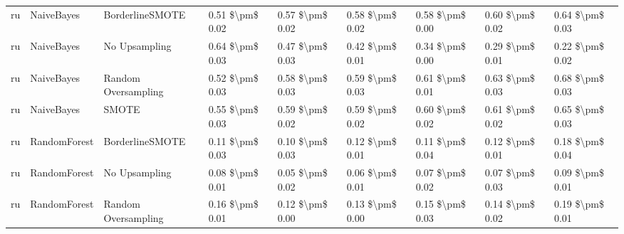 \begin{tabular}{lllllllll}
      ru &                      NaiveBayes &               BorderlineSMOTE &     0.51 \$\textbackslash pm\$ 0.02 &           0.57 \$\textbackslash pm\$ 0.02 &       0.58 \$\textbackslash pm\$ 0.02 &        0.58 \$\textbackslash pm\$ 0.00 &                         0.60 \$\textbackslash pm\$ 0.02 &     0.64 \$\textbackslash pm\$ 0.03 \\
      ru &                      NaiveBayes &                 No Upsampling &     0.64 \$\textbackslash pm\$ 0.03 &           0.47 \$\textbackslash pm\$ 0.03 &       0.42 \$\textbackslash pm\$ 0.01 &        0.34 \$\textbackslash pm\$ 0.00 &                         0.29 \$\textbackslash pm\$ 0.01 &     0.22 \$\textbackslash pm\$ 0.02 \\
      ru &                      NaiveBayes &           Random Oversampling &     0.52 \$\textbackslash pm\$ 0.03 &           0.58 \$\textbackslash pm\$ 0.03 &       0.59 \$\textbackslash pm\$ 0.03 &        0.61 \$\textbackslash pm\$ 0.01 &                         0.63 \$\textbackslash pm\$ 0.03 &     0.68 \$\textbackslash pm\$ 0.03 \\
      ru &                      NaiveBayes &                         SMOTE &     0.55 \$\textbackslash pm\$ 0.03 &           0.59 \$\textbackslash pm\$ 0.02 &       0.59 \$\textbackslash pm\$ 0.02 &        0.60 \$\textbackslash pm\$ 0.02 &                         0.61 \$\textbackslash pm\$ 0.02 &     0.65 \$\textbackslash pm\$ 0.03 \\
      ru &                    RandomForest &               BorderlineSMOTE &     0.11 \$\textbackslash pm\$ 0.03 &           0.10 \$\textbackslash pm\$ 0.03 &       0.12 \$\textbackslash pm\$ 0.01 &        0.11 \$\textbackslash pm\$ 0.04 &                         0.12 \$\textbackslash pm\$ 0.01 &     0.18 \$\textbackslash pm\$ 0.04 \\
      ru &                    RandomForest &                 No Upsampling &     0.08 \$\textbackslash pm\$ 0.01 &           0.05 \$\textbackslash pm\$ 0.02 &       0.06 \$\textbackslash pm\$ 0.01 &        0.07 \$\textbackslash pm\$ 0.02 &                         0.07 \$\textbackslash pm\$ 0.03 &     0.09 \$\textbackslash pm\$ 0.01 \\
      ru &                    RandomForest &           Random Oversampling &     0.16 \$\textbackslash pm\$ 0.01 &           0.12 \$\textbackslash pm\$ 0.00 &       0.13 \$\textbackslash pm\$ 0.00 &        0.15 \$\textbackslash pm\$ 0.03 &                         0.14 \$\textbackslash pm\$ 0.02 &     0.19 \$\textbackslash pm\$ 0.01 \\

\end{tabular}

